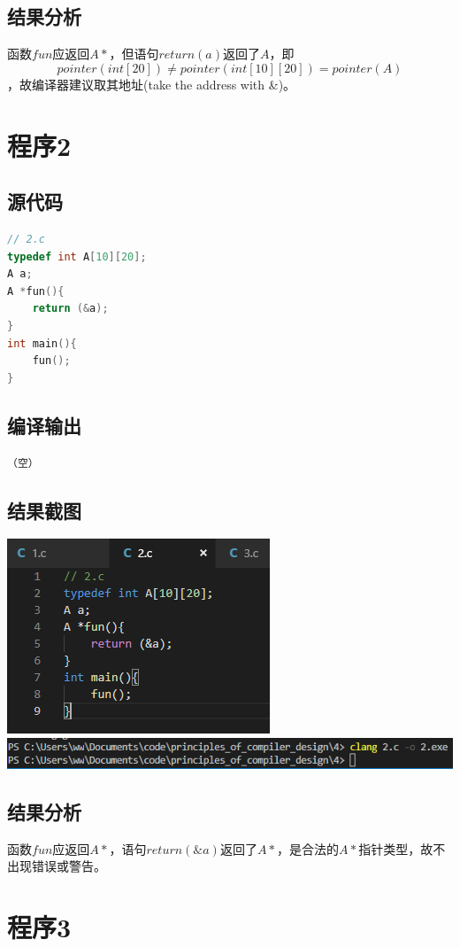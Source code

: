 \documentclass[UTF8]{ctexart}
\begin{document}
\subsection{结果分析}
函数$fun$应返回$A*$，但语句$return (a)$返回了$A$，即
$$pointer(int[20]) \neq pointer(int[10][20]) = pointer(A)$$
，故编译器建议取其地址(take the address with \&)。
\section{程序2}
\subsection{源代码}
\begin{lstlisting}[language={C}]
// 2.c
typedef int A[10][20];
A a;
A *fun(){
    return (&a);
}
int main(){
    fun();
}
    \end{lstlisting}
\subsection{编译输出}
\begin{lstlisting}
（空）
    \end{lstlisting}
\subsection{结果截图}
\includegraphics{2-code} \\
\includegraphics[width=\textwidth]{2-output}
\subsection{结果分析}
函数$fun$应返回$A*$，语句$return (\&a)$返回了$A*$，是合法的$A*$指针类型，故不出现错误或警告。
\section{程序3}
\end{document}
